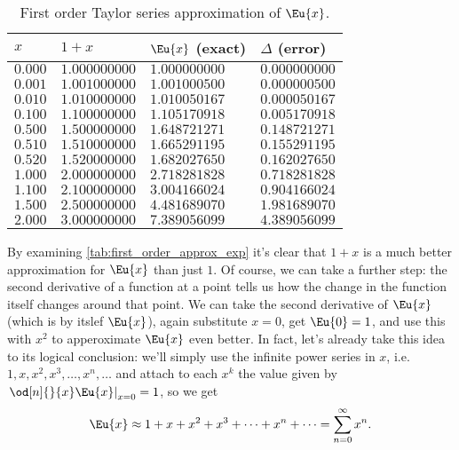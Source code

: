 \begin{table}
	\caption{First order Taylor series approximation of $\Eu{x}$.}
	\label{tab:first_order_approx_exp}
	\begin{center}
		{
			\renewcommand{\arraystretch}{1.2}
			\begin{tabular}[c]{llll}
				\toprule
				$x$     & $1+x$         & $\Eu{x}$ (exact) & $\Delta$ (error) \\
				\midrule
				$0.000$ & $1.000000000$ & $1.000000000$    & $0.000000000$    \\
				$0.001$ & $1.001000000$ & $1.001000500$    & $0.000000500$    \\
				$0.010$ & $1.010000000$ & $1.010050167$    & $0.000050167$    \\
				$0.100$ & $1.100000000$ & $1.105170918$    & $0.005170918$    \\
				$0.500$ & $1.500000000$ & $1.648721271$    & $0.148721271$    \\
				$0.510$ & $1.510000000$ & $1.665291195$    & $0.155291195$    \\
				$0.520$ & $1.520000000$ & $1.682027650$    & $0.162027650$    \\
				$1.000$ & $2.000000000$ & $2.718281828$    & $0.718281828$    \\
				$1.100$ & $2.100000000$ & $3.004166024$    & $0.904166024$    \\
				$1.500$ & $2.500000000$ & $4.481689070$    & $1.981689070$    \\
				$2.000$ & $3.000000000$ & $7.389056099$    & $4.389056099$    \\
				\bottomrule
			\end{tabular}
		}
	\end{center}
\end{table}

By examining \autoref{tab:first_order_approx_exp} it's clear that $1+x$ is a much better approximation for $\Eu{x}$ than just $1$. Of course, we can take a further step: the second derivative of a function at a point tells us how the change in the function itself changes around that point. We can take the second derivative of $\Eu{x}$ (which is by itslef $\Eu{x}$), again substitute $x=0$, get $\Eu{0}=1$, and use this with $x^{2}$ to apperoximate $\Eu{x}$ even better. In fact, let's already take this idea to its logical conclusion: we'll simply use the infinite power series in $x$, i.e. $1,x,x^{2},x^{3},\dots,x^{n},\dots$ and attach to each $x^{k}$ the value given by $\left.\od[n]{}{x}\Eu{x}\right|_{x=0}=1$, so we get
\begin{equation}
	\Eu{x} \approx 1+x+x^{2}+x^{3}+\dots+x^{n}+\dots = \sum\limits_{n=0}^{\infty}x^{n}.
	\label{eq:exp_series_expansion}
\end{equation}

